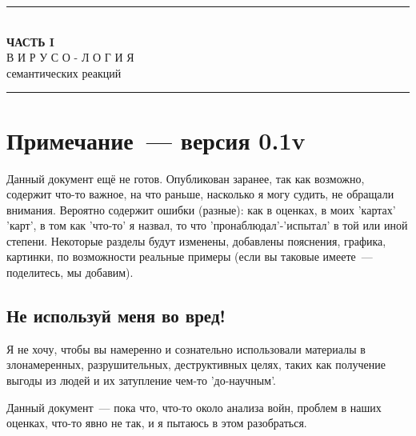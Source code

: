 \documentclass[13pt,a4paper]{article}
\newcommand{\kav}[1]{\textcolor{sce-red}{'#1'}}
\begin{document}
\newpage
\tableofcontents
\newpage


\newpage
\begin{center}
\vspace*{1cm}
\textcolor{sce-gold}{\rule{0.5\textwidth}{0.4pt}}\\[0.8em]
{\montserrat\Large\bfseries{}\color{sce-black}
ЧАСТЬ I}\\[0.4em]
{\montserrat\large{}\color{sce-grey}
В И Р У С О - Л О Г И Я}\\[0.2em]
{\montserrat\normalsize{}\color{sce-grey}
семантических реакций}\\[0.8em]
\textcolor{sce-gold}{\rule{0.5\textwidth}{0.4pt}}
\vspace{1cm}
\end{center}

\section{Примечание~--- версия 0.1v}

Данный документ ещё не готов. Опубликован заранее, так как возможно, содержит что-то
важное, на что раньше, насколько я могу судить, не обращали внимания. Вероятно содержит
ошибки (разные): как в оценках, в моих \kav{картах} \kav{карт}, в том как \kav{что-то} я назвал, то что
\kav{пронаблюдал}-\kav{испытал} в той или иной степени. Некоторые разделы будут изменены, добавлены
пояснения, графика, картинки, по возможности реальные примеры (если вы таковые имеете~---
поделитесь, мы добавим).

\subsection{Не используй меня во вред!}

Я не хочу, чтобы вы намеренно и сознательно использовали материалы в злонамеренных,
разрушительных, деструктивных целях, таких как получение выгоды из людей и их затупление
чем-то \kav{до-научным}.

Данный документ~--- пока что, что-то около анализа войн, проблем в наших оценках, что-то
явно не так, и я пытаюсь в этом разобраться.
\end{document}
